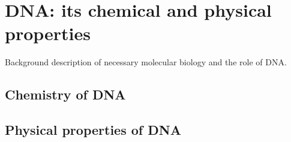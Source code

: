 \chapter{DNA: its chemical and physical properties}
\label{dna}

Background description of necessary molecular biology and the role of DNA.

\section{Chemistry of DNA}

\section{Physical properties of DNA}